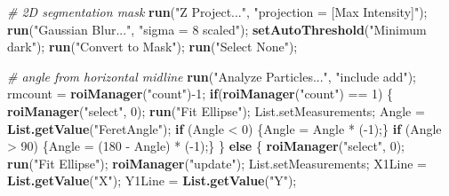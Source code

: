 \documentclass[11pt,singlespacinge,twoside]{reedthesis} %
\newenvironment{Shaded}{}{}
\newcommand{\CommentTok}[1]{\textit{#1}}
\newcommand{\ControlFlowTok}[1]{\textbf{#1}}
\newcommand{\DecValTok}[1]{#1}
\newcommand{\KeywordTok}[1]{\textbf{#1}}
\newcommand{\NormalTok}[1]{#1}
\newcommand{\OperatorTok}[1]{#1}
\newcommand{\StringTok}[1]{#1}
\theoremstyle{definition}
\theoremstyle{definition}
\theoremstyle{definition}
\theoremstyle{remark}
\begin{document}
\scriptsize
\begin{Shaded}
\begin{Highlighting}[numbers=left,,]
\CommentTok{# 2D segmentation mask}
  \KeywordTok{run}\NormalTok{(}\StringTok{"Z Project..."}\NormalTok{, }\StringTok{"projection = [Max Intensity]"}\NormalTok{);}
    \KeywordTok{run}\NormalTok{(}\StringTok{"Gaussian Blur..."}\NormalTok{, }\StringTok{"sigma = 8 scaled"}\NormalTok{);}
    \KeywordTok{setAutoThreshold}\NormalTok{(}\StringTok{"Minimum dark"}\NormalTok{);}
    \KeywordTok{run}\NormalTok{(}\StringTok{"Convert to Mask"}\NormalTok{);}
    \KeywordTok{run}\NormalTok{(}\StringTok{"Select None"}\NormalTok{);}

\CommentTok{# angle from horizontal midline}
    \KeywordTok{run}\NormalTok{(}\StringTok{"Analyze Particles..."}\NormalTok{, }\StringTok{"include add"}\NormalTok{);}
\NormalTok{    rmcount =}\StringTok{ }\KeywordTok{roiManager}\NormalTok{(}\StringTok{"count"}\NormalTok{)}\OperatorTok{-}\DecValTok{1}\NormalTok{;}
    \ControlFlowTok{if}\NormalTok{(}\KeywordTok{roiManager}\NormalTok{(}\StringTok{"count"}\NormalTok{) }\OperatorTok{==}\StringTok{ }\DecValTok{1}\NormalTok{) \{}
        \KeywordTok{roiManager}\NormalTok{(}\StringTok{"select"}\NormalTok{, }\DecValTok{0}\NormalTok{);}
        \KeywordTok{run}\NormalTok{(}\StringTok{"Fit Ellipse"}\NormalTok{);}
\NormalTok{        List.setMeasurements;}
\NormalTok{        Angle =}\StringTok{ }\KeywordTok{List.getValue}\NormalTok{(}\StringTok{"FeretAngle"}\NormalTok{);}
        \ControlFlowTok{if}\NormalTok{ (Angle }\OperatorTok{<}\StringTok{ }\DecValTok{0}\NormalTok{) \{Angle =}\StringTok{ }\NormalTok{Angle }\OperatorTok{*}\StringTok{ }\NormalTok{(}\OperatorTok{-}\DecValTok{1}\NormalTok{);\}}
        \ControlFlowTok{if}\NormalTok{ (Angle }\OperatorTok{>}\StringTok{ }\DecValTok{90}\NormalTok{) \{Angle =}\StringTok{ }\NormalTok{(}\DecValTok{180} \OperatorTok{-}\StringTok{ }\NormalTok{Angle) }\OperatorTok{*}\StringTok{ }\NormalTok{(}\OperatorTok{-}\DecValTok{1}\NormalTok{);\}}
\NormalTok{    \} }\ControlFlowTok{else}\NormalTok{ \{}
        \KeywordTok{roiManager}\NormalTok{(}\StringTok{"select"}\NormalTok{, }\DecValTok{0}\NormalTok{);}
        \KeywordTok{run}\NormalTok{(}\StringTok{"Fit Ellipse"}\NormalTok{);}
        \KeywordTok{roiManager}\NormalTok{(}\StringTok{"update"}\NormalTok{);}
\NormalTok{        List.setMeasurements;}
\NormalTok{        X1Line =}\StringTok{ }\KeywordTok{List.getValue}\NormalTok{(}\StringTok{"X"}\NormalTok{);}
\NormalTok{        Y1Line =}\StringTok{ }\KeywordTok{List.getValue}\NormalTok{(}\StringTok{"Y"}\NormalTok{);}

\end{Highlighting}
\end{Shaded}
\end{document}
